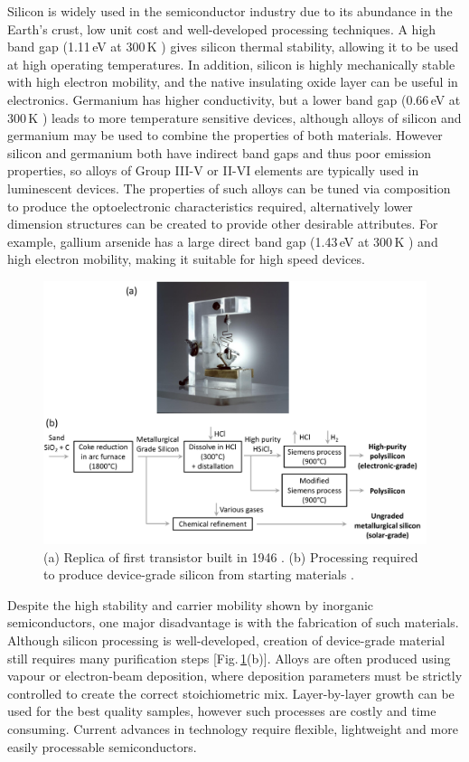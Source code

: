 Silicon is widely used in the semiconductor industry due to its abundance in the Earth's crust, low unit cost and well-developed processing techniques. A high band gap (1.11\,eV at 300\,K \cite{Kittel1986}) gives silicon thermal stability, allowing it to be used at high operating temperatures. In addition, silicon is highly mechanically stable with high electron mobility, and the native insulating oxide layer can be useful in electronics. Germanium has higher conductivity, but a lower band gap (0.66\,eV at 300\,K \cite{Kittel1986}) leads to more temperature sensitive devices, although alloys of silicon and germanium may be used to combine the properties of both materials. However silicon and germanium both have indirect band gaps and thus poor emission properties, so alloys of Group III-V or II-VI elements are typically used in luminescent devices. The properties of such alloys can be tuned via composition to produce the optoelectronic characteristics required, alternatively lower dimension structures can be created to provide other desirable attributes. For example, gallium arsenide has a large direct band gap (1.43\,eV at 300\,K \cite{Kittel1986}) and high electron mobility, making it suitable for high speed devices.
\begin{figure}[h!]
\centering
\includegraphics[width=\textwidth]{Fig1}
\caption{(a) Replica of first transistor built in 1946 \cite{Transistor}. (b) Processing required to produce device-grade silicon from starting materials \cite{Silicon}.}
\label{1Fig1}
\end{figure}

Despite the high stability and carrier mobility shown by inorganic semiconductors, one major disadvantage is with the fabrication of such materials. Although silicon processing is well-developed, creation of device-grade material still requires many purification steps [Fig.\,\ref{1Fig1}(b)]. Alloys are often produced using vapour or electron-beam deposition, where deposition parameters must be strictly controlled to create the correct stoichiometric mix. Layer-by-layer growth can be used for the best quality samples, however such processes are costly and time consuming. Current advances in technology require flexible, lightweight and more easily processable semiconductors.

